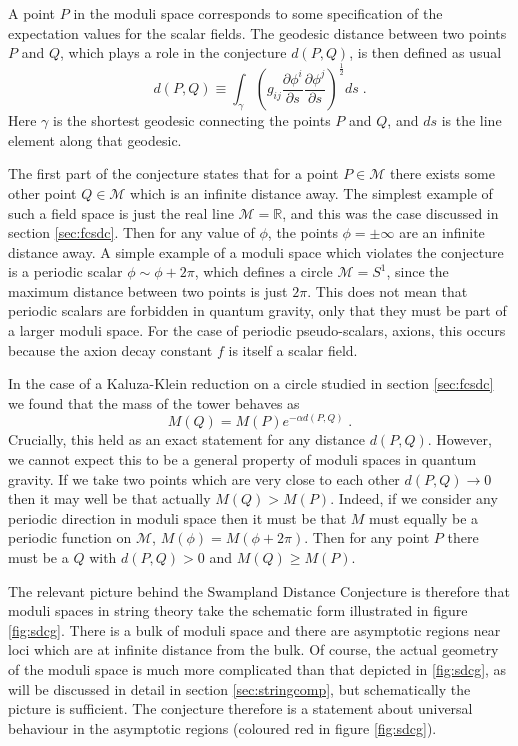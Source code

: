 \documentclass[11pt,a4paper]{article}
\numberwithin{equation}{section}
\numberwithin{table}{section}\setlength{\multlinegap}{25pt}
\newcommand{\cM}{\mathcal M}
\newcommand{\be}{\begin{equation}}
\newcommand{\ee}{\end{equation}}
\begin{document}
A point $P$ in the moduli space corresponds to some specification of the expectation values for the scalar fields. The geodesic distance between two points $P$ and $Q$, which plays a role in the conjecture $d\left(P,Q\right)$, is then defined as usual
\be
d\left(P,Q\right) \equiv \int_{\gamma}  \left(g_{ij}\frac{\partial \phi^i}{\partial s} \frac{\partial \phi^j}{\partial s}\right)^{\frac12} ds \;.
\ee
Here $\gamma$ is the shortest geodesic connecting the points $P$ and $Q$, and $ds$ is the line element along that geodesic. 

The first part of the conjecture states that for a point $P \in \cM$ there exists some other point $Q \in \cM$ which is an infinite distance away. The simplest example of such a field space is just the real line $\cM = \mathbb{R}$, and this was the case discussed in section \ref{sec:fcsdc}. Then for any value of $\phi$, the points $\phi = \pm \infty$ are an infinite distance away. A simple example of a moduli space which violates the conjecture is a periodic scalar $\phi \sim \phi + 2\pi$, which defines a circle $\cM = S^1$, since the maximum distance between two points is just $2 \pi$. This does not mean that periodic scalars are forbidden in quantum gravity, only that they must be part of a larger moduli space. For the case of periodic pseudo-scalars, axions, this occurs because the axion decay constant $f$ is itself a scalar field.

In the case of a Kaluza-Klein reduction on a circle studied in section \ref{sec:fcsdc} we found that the mass of the tower behaves as 
\be
\label{kksdcm}
M\left(Q\right) = M\left(P\right)e^{-\alpha d\left(P,Q\right)} \;. 
\ee
Crucially, this held as an exact statement for any distance $d\left(P,Q\right)$. However, we cannot expect this to be a general property of moduli spaces in quantum gravity. If we take two points which are very close to each other $d\left(P,Q\right) \rightarrow 0$ then it may well be that actually $M\left(Q\right) > M\left(P\right)$. Indeed, if we consider any periodic direction in moduli space then it must be that $M$ must equally be a periodic function on $\cM$, $M\left( \phi \right) = M\left( \phi + 2\pi \right)$. Then for any point $P$ there must be a $Q$ with $d\left(P,Q\right)>0$ and $M\left(Q\right) \geq M\left(P\right)$. 

The relevant picture behind the Swampland Distance Conjecture is therefore that moduli spaces in string theory take the schematic form illustrated in figure \ref{fig:sdcg}. There is a bulk of moduli space and there are asymptotic regions near loci which are at infinite distance from the bulk. Of course, the actual geometry of the moduli space is much more complicated than that depicted in \ref{fig:sdcg}, as will be discussed in detail in section \ref{sec:stringcomp}, but schematically the picture is sufficient. The conjecture therefore is a statement about universal behaviour in the asymptotic regions (coloured red in figure \ref{fig:sdcg}). 
\end{document}
